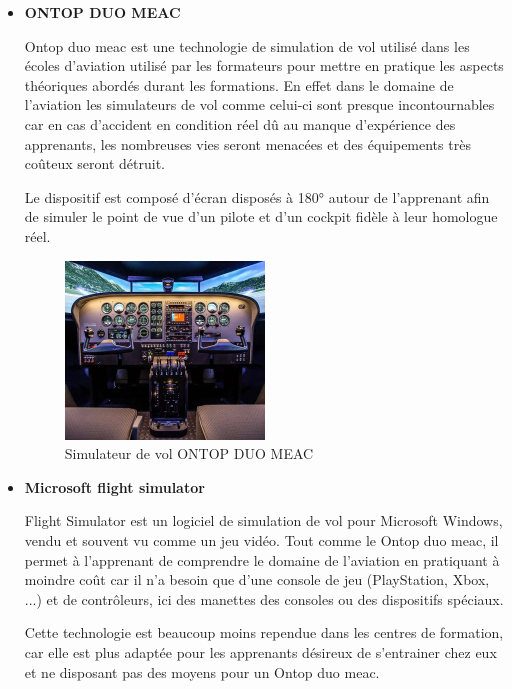 \begin{itemize}
	\item \textbf{ONTOP DUO MEAC}

	      Ontop duo meac est une technologie de simulation de vol utilisé dans les écoles d’aviation utilisé par les formateurs pour mettre en pratique les aspects théoriques abordés durant les formations. En effet dans le domaine de l’aviation les simulateurs de vol comme celui-ci sont presque incontournables car en cas d’accident en condition réel dû au manque d’expérience des apprenants, les nombreuses vies seront menacées et des équipements très coûteux seront détruit.

	      Le dispositif est composé d’écran disposés à 180° autour de l’apprenant afin de simuler le point de vue d’un pilote et d’un cockpit fidèle à leur homologue réel.

	      \begin{figure}[H]
		      \centering
		      \includegraphics[width=0.5\textwidth]{img/svol1}
		      \caption{Simulateur de vol ONTOP DUO MEAC}
		      \label{fig:mesh1}
	      \end{figure}

	\item \textbf{Microsoft flight simulator}

	      Flight Simulator est un logiciel de simulation de vol pour Microsoft Windows, vendu et souvent vu comme un jeu vidéo. Tout comme le Ontop duo meac, il permet à l'apprenant de comprendre le domaine de l’aviation en pratiquant à moindre coût car il n’a besoin que d’une console de jeu (PlayStation, Xbox, ...) et de contrôleurs, ici des manettes des consoles ou des dispositifs spéciaux.

	      Cette technologie est beaucoup moins rependue dans les centres de formation, car elle est plus adaptée pour les apprenants désireux de s’entrainer chez eux et ne disposant pas des moyens pour un Ontop duo meac.


\end{itemize}
